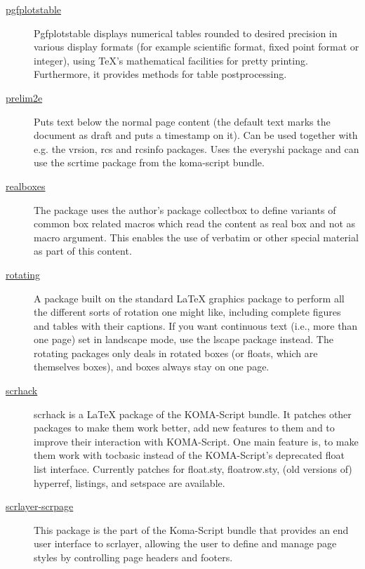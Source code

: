 \begin{description}
	\item[\href{https://www.ctan.org/pkg/pgfplotstable}{pgfplotstable}] Pgfplotstable displays numerical tables rounded to desired precision in various display formats (for example scientific format, fixed point format or integer), using {\TeX}'s mathematical facilities for pretty printing. Furthermore, it provides methods for table postprocessing. \cite{CTANTeam.2020aw}
	
	\item[\href{https://www.ctan.org/pkg/prelim2e}{prelim2e}] Puts text below the normal page content (the default text marks the document as draft and puts a timestamp on it). Can be used together with e.g. the vrsion, rcs and rcsinfo packages. Uses the everyshi package and can use the scrtime package from the koma-script bundle. \cite{CTANTeam.2020bl}
	
	\item[\href{https://www.ctan.org/pkg/realboxes}{realboxes}] The package uses the author's package collectbox to define variants of common box related macros which read the content as real box and not as macro argument. This enables the use of verbatim or other special material as part of this content. \cite{CTANTeam.2020be}
	
	\item[\href{https://www.ctan.org/pkg/rotating}{rotating}] A package built on the standard {\LaTeX} graphics package to perform all the different sorts of rotation one might like, including complete figures and tables with their captions. If you want continuous text (i.e., more than one page) set in landscape mode, use the lscape package instead. The rotating packages only deals in rotated boxes (or floats, which are themselves boxes), and boxes always stay on one page. \cite{CTANTeam.2020az}
	
	\item[\href{https://www.ctan.org/pkg/koma-script}{scrhack}] scrhack is a {\LaTeX} package of the KOMA-Script bundle. It patches other packages to make them work better, add new features to them and to improve their interaction with KOMA-Script. One main feature is, to make them work with tocbasic instead of the KOMA-Script's deprecated float list interface. Currently patches for float.sty, floatrow.sty, (old versions of) hyperref, listings, and setspace are available. \cite{CTANTeam.2020bs}
	
	\item[\href{https://www.ctan.org/pkg/scrlayer-scrpage}{scrlayer-scrpage}] This package is the part of the Koma-Script bundle that provides an end user interface to scrlayer, allowing the user to define and manage page styles by controlling page headers and footers. \cite{CTANTeam.2020bt}
	

\end{description}

